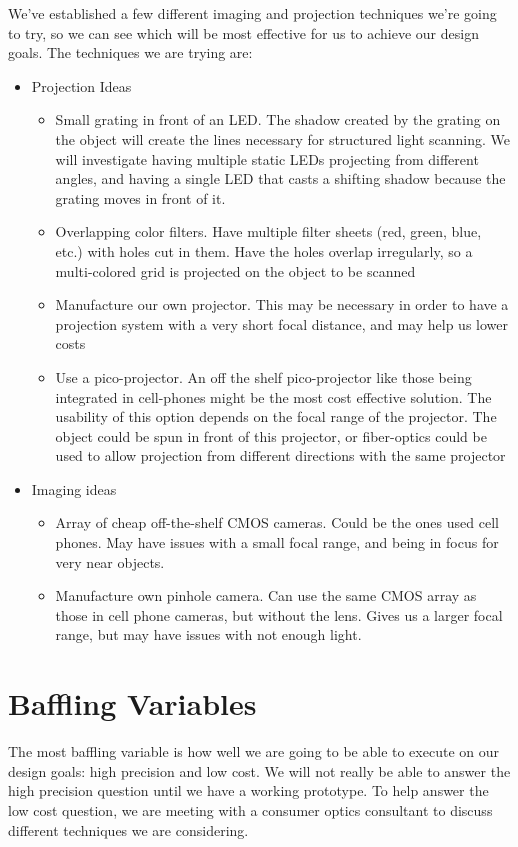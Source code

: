 \documentclass[10pt]{article}
\begin{document}
We've established a few different imaging and projection techniques we're going
to try, so we can see which will be most effective for us to achieve our design
goals. The techniques we are trying are:
\begin{itemize}
\item Projection Ideas
\begin{itemize}
\item Small grating in front of an LED. The shadow created by the grating on the
  object will create the lines necessary for structured light scanning.  We will
  investigate having multiple static LEDs projecting from different angles, and
  having a single LED that casts a shifting shadow because the grating moves in
  front of it.
\item Overlapping color filters. Have multiple filter sheets (red, green, blue,
  etc.) with holes cut in them. Have the holes overlap irregularly, so a
  multi-colored grid is projected on the object to be scanned
\item Manufacture our own projector. This may be necessary in order to have a
  projection system with a very short focal distance, and may help us lower
  costs
\item Use a pico-projector. An off the shelf pico-projector like those being
  integrated in cell-phones might be the most cost effective solution.  The
  usability of this option depends on the focal range of the projector. The
  object could be spun in front of this projector, or fiber-optics could be used
  to allow projection from different directions with the same projector
\end{itemize}

\item Imaging ideas
\begin{itemize}
\item Array of cheap off-the-shelf CMOS cameras. Could be the ones used cell
  phones.  May have issues with a small focal range, and being in focus for very
  near objects.
\item Manufacture own pinhole camera.  Can use the same CMOS array as those in
  cell phone cameras, but without the lens.  Gives us a larger focal range, but
  may have issues with not enough light.
\end{itemize}
\end{itemize}

\section{Baffling Variables}
The most baffling variable is how well we are going to be able to execute on our
design goals: high precision and low cost. We will not really be able to answer
the high precision question until we have a working prototype. To help answer
the low cost question, we are meeting with a consumer optics consultant to
discuss different techniques we are considering.
\end{document}
